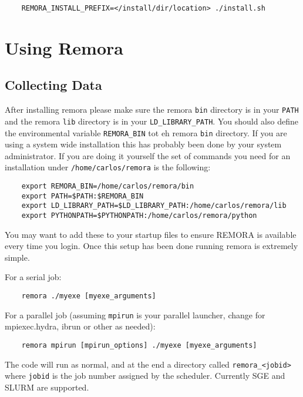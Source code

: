 \documentclass[10pt,a4paper]{report}
\begin{document}
\begin{verbatim}
    REMORA_INSTALL_PREFIX=</install/dir/location> ./install.sh
\end{verbatim}

\FloatBarrier
\chapter{Using Remora}

\section{Collecting Data}
After installing remora please make sure the remora \verb+bin+ directory is in your \verb+PATH+ and the remora \verb+lib+ directory is in your \verb|LD_LIBRARY_PATH|. You should also define the environmental variable \verb+REMORA_BIN+ tot eh remora \verb+bin+ directory. If you are using a system wide installation this has probably been done by your system administrator. If you are doing it yourself the set of commands you need for an installation under \verb+/home/carlos/remora+ is the following:

\begin{verbatim}
	export REMORA_BIN=/home/carlos/remora/bin
	export PATH=$PATH:$REMORA_BIN
	export LD_LIBRARY_PATH=$LD_LIBRARY_PATH:/home/carlos/remora/lib
	export PYTHONPATH=$PYTHONPATH:/home/carlos/remora/python
\end{verbatim}

You may want to add these to your startup files to ensure REMORA is available every time you login. Once this setup has been done running remora is extremely simple.

For a serial job:

\begin{verbatim}
	remora ./myexe [myexe_arguments]
\end{verbatim} 

For a parallel job (assuming \verb+mpirun+ is your parallel launcher, change for mpiexec.hydra, ibrun or other as needed):

\begin{verbatim}
	remora mpirun [mpirun_options] ./myexe [myexe_arguments]
\end{verbatim} 

The code will run as normal, and at the end a directory called \verb+remora_<jobid>+ where \verb+jobid+ is the job number assigned by the scheduler. Currently SGE and SLURM are supported.
\end{document}
